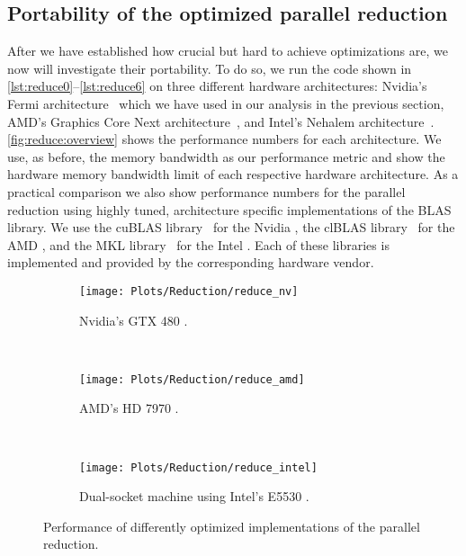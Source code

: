 \subsection{Portability of the optimized parallel reduction}
After we have established how crucial but hard to achieve optimizations are, we now will investigate their portability.
To do so, we run the code shown in \autoref{lst:reduce0}--\ref{lst:reduce6} on three different hardware architectures:
Nvidia's Fermi \GPU architecture~\cite{CUDAFermi2009} which we have used in our analysis in the previous section, AMD's Graphics Core Next \GPU architecture~\cite{AMDGCN2012}, and Intel's Nehalem \CPU architecture~\cite{IntelNehalem2008}.
\autoref{fig:reduce:overview} shows the performance numbers for each architecture.
We use, as before, the memory bandwidth as our performance metric and show the hardware memory bandwidth limit of each respective hardware architecture.
As a practical comparison we also show performance numbers for the parallel reduction using highly tuned, architecture specific implementations of the BLAS library.
We use the cuBLAS library~\cite{cuBLAS} for the Nvidia \GPU, the clBLAS library~\cite{clBLAS} for the AMD \GPU, and the MKL library~\cite{MKL} for the Intel \CPU.
Each of these libraries is implemented and provided by the corresponding hardware vendor.

\begin{figure}[p]
  \centering
\begin{subfigure}{\linewidth}
  \texttt{[image: Plots/Reduction/reduce\_nv]}
  \caption{Nvidia's GTX 480 \GPU.}
  \label{fig:reduce:nvidia}
\end{subfigure}\\
\begin{subfigure}{\linewidth}
  \texttt{[image: Plots/Reduction/reduce\_amd]}
  \caption{AMD's HD 7970 \GPU.}
  \label{fig:reduce:amd}
\end{subfigure}\\
\begin{subfigure}{\linewidth}
  \texttt{[image: Plots/Reduction/reduce\_intel]}
    \caption{Dual-socket machine using Intel's E5530 \CPU.}
  \label{fig:reduce:intel}
\end{subfigure}
  \caption{Performance of differently optimized implementations of the parallel reduction.}
  \label{fig:reduce:overview}
\end{figure}


